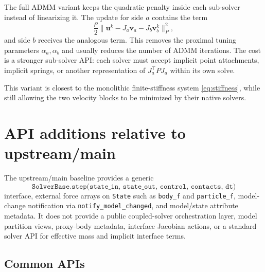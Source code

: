 \documentclass[11pt]{article}
\newcommand{\va}{\bm v_a}
\newcommand{\vb}{\bm v_b}
\newcommand{\uu}{\bm u}
\newcommand{\Ja}{J_a}
\newcommand{\Jb}{J_b}
\newcommand{\Pmat}{P}
\begin{document}
The full ADMM variant keeps the quadratic penalty inside each sub-solver instead of
linearizing it. The update for side $a$ contains the term
\[
    \frac{\rho}{2}
    \|\uu^k-\Ja\va-\Jb\vb^k\|_{\Pmat}^2 ,
\]
and side $b$ receives the analogous term. This removes the proximal tuning parameters
$\alpha_a,\alpha_b$ and usually reduces the number of ADMM iterations. The cost is a
stronger sub-solver API: each solver must accept implicit point attachments, implicit
springs, or another representation of $\Ja^\top\Pmat\Ja$ within its own solve.

This variant is closest to the monolithic finite-stiffness system
\eqref{eq:stiffness}, while still allowing the two velocity blocks to be minimized by
their native solvers.

\section{API additions relative to upstream/main}

The upstream/main baseline provides a generic
\[
    \texttt{SolverBase.step(state\_in, state\_out, control, contacts, dt)}
\]
interface, external force arrays on \texttt{State} such as \texttt{body\_f} and
\texttt{particle\_f}, model-change notification via \texttt{notify\_model\_changed},
and model/state attribute metadata. It does not provide a public coupled-solver
orchestration layer, model partition views, proxy-body metadata, interface Jacobian
actions, or a standard solver API for effective mass and implicit interface terms.

\subsection{Common APIs}
\end{document}
